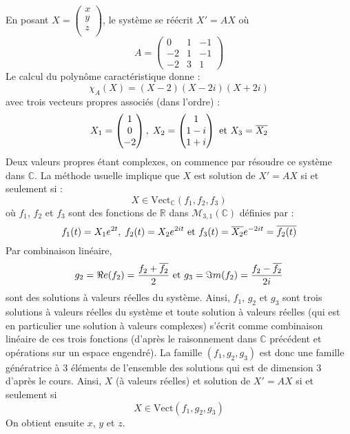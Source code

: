 \documentclass[a4paper,10pt]{report}
\begin{document}
\corr En posant $X = \begin{pmatrix}
x \\
y \\
z \\
\end{pmatrix}$, le système se réécrit $X'=AX$ où 
$$ A = \begin{pmatrix}
0 & 1 & -1 \\
-2 & 1 & -1 \\
-2 & 3 & 1 
\end{pmatrix}$$
Le calcul du polynôme caractéristique donne :
$$ \chi_A(X) = (X-2)(X-2i)(X+2i)$$
avec trois vecteurs propres associés (dans l'ordre) :
$$ X_1 = \begin{pmatrix}
1 \\
0 \\
-2
\end{pmatrix}, \; X_2 = \begin{pmatrix}
1 \\
1-i\\
1+i\\
\end{pmatrix} \hbox{ et }  X_3 = \overline{X_2} $$
Deux valeurs propres étant complexes, on commence par résoudre ce système dans $\mathbb{C}$. La méthode usuelle implique que $X$ est solution de $X'=AX$ si et seulement si :
$$X \in \textrm{Vect}_{\mathbb{C}} (f_1,f_2,f_3)$$
où $f_1$, $f_2$ et $f_3$ sont des fonctions de $\mathbb{R}$ dans $\mathcal{M}_{3,1}(\mathbb{C})$ définies par :
$$ f_1(t)= X_1 e^{2t}, \; f_2(t) = X_2 e^{2it} \hbox{ et } f_3(t) = \overline{X_2} e^{-2i t} = \overline{f_2(t)}$$
Par combinaison linéaire,
$$ g_2=\Re e(f_2) = \dfrac{f_2+ \overline{f_2}}{2} \hbox{ et } g_3=\Im m(f_2) = \dfrac{f_2- \overline{f_2}}{2i}$$
sont des solutions à valeurs réelles du système. Ainsi, $f_1$, $g_2$ et $g_3$ sont trois solutions à valeurs réelles du système et toute solution à valeurs réelles (qui est en particulier une solution à valeurs complexes) s'écrit comme combinaison linéaire de ces trois fonctions (d'après le raisonnement dans $\mathbb{C}$ précédent et opérations sur un espace engendré). La famille $(f_1,g_2,g_3)$ est donc une famille génératrice à $3$ éléments de l'ensemble des solutions qui est de dimension $3$ d'après le cours. Ainsi, $X$ (à valeurs réelles) et solution de $X'=AX$ si et seulement si 
$$ X \in \textrm{Vect}(f_1,g_2,g_3)$$
On obtient ensuite $x$, $y$ et $z$.
\end{document}
